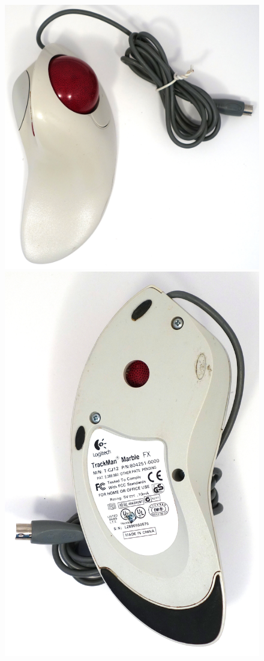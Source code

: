 \documentclass[11pt, a4paper]{article}
\begin{document}
\begin{figure}[h]
    \centering
    \includegraphics[scale=0.32]{1998_logitech_trackman_marble_fx/top_60.jpg}
    \includegraphics[scale=0.32]{1998_logitech_trackman_marble_fx/bottom_60.jpg}

\end{figure}
\end{document}
